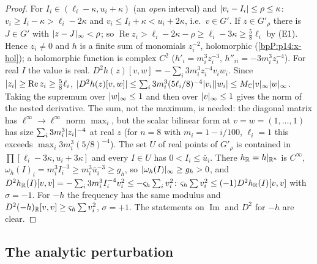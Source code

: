 \begin{proof}
\label{stepP:p14:hd-i} For $I_i\in(\ell_i-\kappa,u_i+\kappa)$ (an \emph{open} interval) and $\lvert v_i-I_i\rvert\le\rho\le\kappa$: $v_i\ge I_i-\kappa>\ell_i-2\kappa$ and $v_i\le I_i+\kappa<u_i+2\kappa$, i.e.\ $v\in G'$.
\label{stepP:p14:hd-ii} If $z\in G'_\rho$ there is $J\in G'$ with $\lvert z-J\rvert_\infty<\rho$; so $\operatorname{Re}z_i>\ell_i-2\kappa-\rho\ge\ell_i-3\kappa\ge\frac58\ell_i$ by (E1). Hence $z_i\ne0$ and $h$ is a finite sum of monomials $z_i^{-2}$, holomorphic (\ref{bpP:p14:x-hol}); a holomorphic function is complex $C^2$ ($h'_i=m_i^3z_i^{-3}$, $h''_{ii}=-3m_i^3z_i^{-4}$). For real $I$ the value is real.
\label{stepP:p14:hd-iv} $D^2h(z)[v,w]=-\sum_i3m_i^3z_i^{-4}v_iw_i$. Since $\lvert z_i\rvert\ge\operatorname{Re}z_i\ge\frac58\ell_i$, $\lvert D^2h(z)[v,w]\rvert\le\sum_i3m_i^3(5\ell_i/8)^{-4}\lvert v_i\rvert\lvert w_i\rvert\le M_{\mathbb{C}}\lvert v\rvert_\infty\lvert w\rvert_\infty$. Taking the supremum over $\lvert w\rvert_\infty\le1$ and then over $\lvert v\rvert_\infty\le1$ gives the norm of the nested derivative. The sum, not the maximum, is needed: the diagonal matrix has $\ell^\infty\to\ell^\infty$ norm $\max_i$, but the scalar bilinear form at $v=w=(1,\dots,1)$ has size $\sum_i3m_i^3\lvert z_i\rvert^{-4}$ at real $z$ (for $n=8$ with $m_i=1-i/100$, $\ell_i=1$ this exceeds $\max_i3m_i^3(5/8)^{-4}$).
\label{stepP:p14:hd-v} The set $U$ of real points of $G'_\rho$ is contained in $\prod[\ell_i-3\kappa,u_i+3\kappa]$ and every $I\in U$ has $0<I_i\le\bar u_i$. There $h_{\mathbb{R}}=h|_{\mathbb{R}^n}$ is $C^\infty$, $\omega_h(I)_i=m_i^3I_i^{-3}\ge m_i^3\bar u_i^{-3}\ge g_h$, so $\lvert \omega_h(I)\rvert_\infty\ge g_h>0$, and $D^2h_{\mathbb{R}}(I)[v,v]=-\sum_i3m_i^3I_i^{-4}v_i^2\le-\varsigma_h\sum_iv_i^2$: $\varsigma_h\sum v_i^2\le(-1)D^2h_{\mathbb{R}}(I)[v,v]$ with $\sigma=-1$. For $-h$ the frequency has the same modulus and $D^2(-h)_{\mathbb{R}}[v,v]\ge\varsigma_h\sum v_i^2$, $\sigma=+1$. The statements on $\operatorname{Im}$ and $D^2$ for $-h$ are clear.
\end{proof}

\subsection{The analytic perturbation}\label{bpP:p14:sec-pert}

